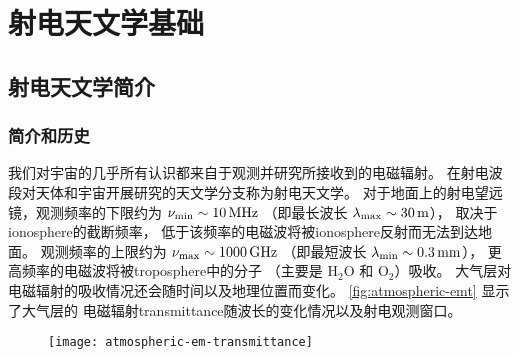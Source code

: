 

\chapter{射电天文学基础}
\label{chap:radio-astronomy}

\section{射电天文学简介}
\label{sec:radio-astro-intro}

\subsection{简介和历史}

我们对宇宙的几乎所有认识都来自于观测并研究所接收到的电磁辐射。
在射电波段对天体和宇宙开展研究的天文学分支称为射电天文学。
对于地面上的射电望远镜，观测频率的下限约为 $\nu_{\R{min}} \sim \SI{10}{\MHz}$
（即最长波长 $\lambda_{\mathrm{max}} \sim \SI{30}{\meter}$），
取决于\ac{ionosphere}的截断频率，
低于该频率的电磁波将被\ac{ionosphere}反射而无法到达地面。
观测频率的上限约为 $\nu_{\R{max}} \sim \SI{1000}{\GHz}$
（即最短波长 $\lambda_{\R{min}} \sim \SI{0.3}{\mm}$），
更高频率的电磁波将被\ac{troposphere}中的分子
（主要是 $\mathrm{H_2 O}$ 和 $\mathrm{O_2}$）吸收。
大气层对电磁辐射的吸收情况还会随时间以及地理位置而变化。
\autoref{fig:atmospheric-emt} 显示了大气层的
电磁辐射\ac{transmittance}随波长的变化情况以及射电观测窗口。

\begin{figure}[htp]
  \centering
  \texttt{[image: atmospheric-em-transmittance]}
  \label{fig:atmospheric-emt}
\end{figure}

